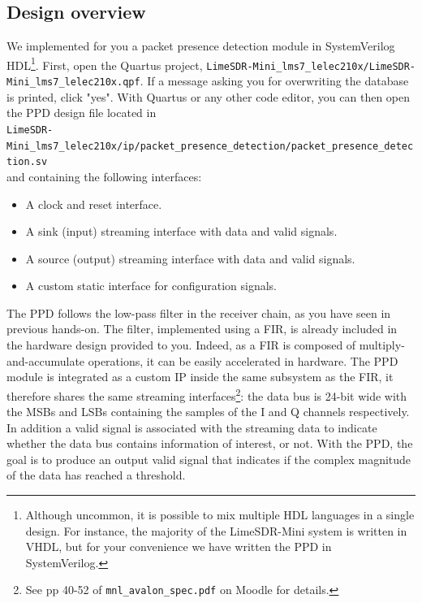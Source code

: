 \subsection{Design overview}
We implemented for you a packet presence detection module in SystemVerilog HDL\footnote{Although uncommon, it is possible to mix multiple HDL languages in a single design. For instance, the majority of the LimeSDR-Mini system is written in VHDL, but for your convenience we have written the PPD in SystemVerilog.}. First, open the Quartus project, \texttt{LimeSDR-Mini\_lms7\_lelec210x/LimeSDR-Mini\_lms7\_lelec210x.qpf}. If a message asking you for overwriting the database is printed, click "yes". With Quartus or any other code editor, you can then open the PPD design file located in\\ \texttt{LimeSDR-Mini\_lms7\_lelec210x/ip/packet\_presence\_detection/packet\_presence\_detection.sv}\\ and containing the following interfaces:
\begin{itemize}
    \item A clock and reset interface.
    \item A sink (input) streaming interface with data and valid signals.
    \item A source (output) streaming interface with data and valid signals.
    \item A custom static interface for configuration signals.
\end{itemize}
The PPD follows the low-pass filter in the receiver chain, as you have seen in previous hands-on. The filter, implemented using a FIR, is already included in the hardware design provided to you. Indeed, as a FIR is composed of multiply-and-accumulate operations, it can be easily accelerated in hardware. The  PPD module is integrated as a custom IP inside the same subsystem as the FIR, it therefore shares the same streaming interfaces\footnote{See pp 40-52 of \texttt{mnl\_avalon\_spec.pdf} on Moodle for details.}: the data bus is 24-bit wide with the MSBs and LSBs containing the samples of the I and Q channels respectively. In addition a valid signal is associated with the streaming data to indicate whether the data bus contains information of interest, or not. With the PPD, the goal is to produce an output valid signal that indicates if the complex magnitude of the data has reached a threshold.

